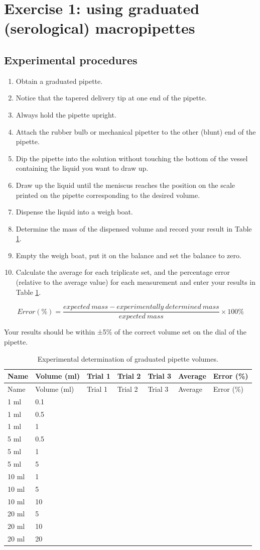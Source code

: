 \documentclass[]{book}
\providecommand{\tightlist}{%
  \setlength{\itemsep}{0pt}\setlength{\parskip}{0pt}}
\theoremstyle{definition}
\theoremstyle{definition}
\theoremstyle{definition}
\theoremstyle{remark}
\begin{document}
\section{Exercise 1: using graduated (serological)
macropipettes}\label{exercise-1-using-graduated-serological-macropipettes}

\subsection{Experimental procedures}\label{experimental-procedures-4}

\begin{enumerate}
\def\labelenumi{\arabic{enumi}.}
\tightlist
\item
  Obtain a graduated pipette.
\item
  Notice that the tapered delivery tip at one end of the pipette.
\item
  Always hold the pipette upright.
\item
  Attach the rubber bulb or mechanical pipetter to the other (blunt) end
  of the pipette.
\item
  Dip the pipette into the solution without touching the bottom of the
  vessel containing the liquid you want to draw up.
\item
  Draw up the liquid until the meniscus reaches the position on the
  scale printed on the pipette corresponding to the desired volume.
\item
  Dispense the liquid into a weigh boat.
\item
  Determine the mass of the dispensed volume and record your result in
  Table \ref{tab:graduated}.
\item
  Empty the weigh boat, put it on the balance and set the balance to
  zero.
\item
  Calculate the average for each triplicate set, and the percentage
  error (relative to the average value) for each measurement and enter
  your results in Table \ref{tab:graduated}.
\end{enumerate}

\[ Error (\%) = \frac{expected\ mass - experimentally\ determined\ mass}{expected\ mass} \times 100\% \]

Your results should be within ±5\% of the correct volume set on the dial
of the pipette.

\begin{longtable}[]{@{}lllllll@{}}
\caption{\label{tab:graduated} Experimental determination of graduated
pipette volumes.}\tabularnewline
\toprule
Name & Volume (ml) & Trial 1 & Trial 2 & Trial 3 & Average & Error
(\%)\tabularnewline
\midrule
\endfirsthead
\toprule
Name & Volume (ml) & Trial 1 & Trial 2 & Trial 3 & Average & Error
(\%)\tabularnewline
\midrule
\endhead
1 ml & 0.1 & & & & &\tabularnewline
1 ml & 0.5 & & & & &\tabularnewline
1 ml & 1 & & & & &\tabularnewline
5 ml & 0.5 & & & & &\tabularnewline
5 ml & 1 & & & & &\tabularnewline
5 ml & 5 & & & & &\tabularnewline
10 ml & 1 & & & & &\tabularnewline
10 ml & 5 & & & & &\tabularnewline
10 ml & 10 & & & & &\tabularnewline
20 ml & 5 & & & & &\tabularnewline
20 ml & 10 & & & & &\tabularnewline
20 ml & 20 & & & & &\tabularnewline
\bottomrule
\end{longtable}
\end{document}
